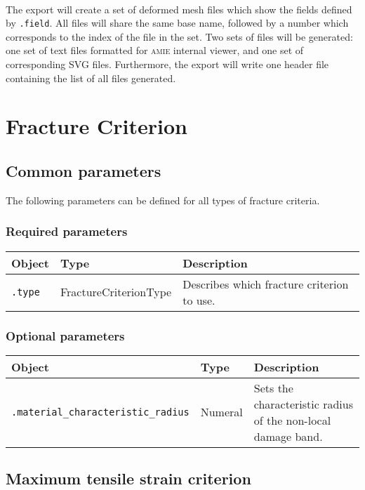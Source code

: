 \documentclass[10pt]{article}
\begin{document}
\paragraph{} The export will create a set of deformed mesh files which show the fields defined by \verb+.field+. All files will share the same base name, followed by a number which corresponds to the index of the file in the set. Two sets of files will be generated: one set of text files formatted for \textsc{amie} internal viewer, and one set of corresponding SVG files. Furthermore, the export will write one header file containing the list of all files generated.

\section{Fracture Criterion}

\subsection{Common parameters}

The following parameters can be defined for all types of fracture criteria.

\subsubsection*{Required parameters}

\begin{tabularx}{\textwidth}{llX}
\hline 
Object & Type & Description \\ 
\hline 
\verb+.type+ & FractureCriterionType & Describes which fracture criterion to use. \\ 
\hline 
\end{tabularx}

\subsubsection*{Optional parameters}

\begin{tabularx}{\textwidth}{llX}
\hline 
Object & Type & Description \\ 
\hline 
\verb+.material_characteristic_radius+ & Numeral & Sets the characteristic radius of the non-local damage band. \\ 
\hline 
\end{tabularx}

\subsection{Maximum tensile strain criterion}
\end{document}
